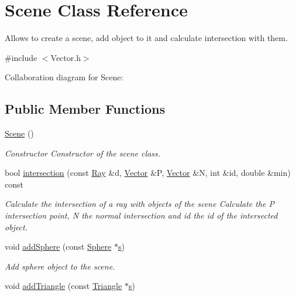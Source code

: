 \hypertarget{classScene}{}\section{Scene Class Reference}
\label{classScene}


Allows to create a scene, add object to it and calculate intersection with them.  




{\ttfamily \#include $<$Vector.\+h$>$}



Collaboration diagram for Scene\+:
\subsection*{Public Member Functions}
\begin{DoxyCompactItemize}
\item 
\mbox{\label{classScene_ad10176d75a9cc0da56626f682d083507}} 
\hyperlink{classScene_ad10176d75a9cc0da56626f682d083507}{Scene} ()
\begin{DoxyCompactList}\small\item\em Constructor Constructor of the scene class. \end{DoxyCompactList}\item 
bool \hyperlink{classScene_a2006d6fa80e8bf343da5a8ed3d1f5140}{intersection} (const \hyperlink{classRay}{Ray} \&d, \hyperlink{classVector}{Vector} \&P, \hyperlink{classVector}{Vector} \&N, int \&id, double \&min) const
\begin{DoxyCompactList}\small\item\em Calculate the intersection of a ray with objects of the scene Calculate the P intersection point, N the normal intersection and id the id of the intersected object. \end{DoxyCompactList}\item 
void \hyperlink{classScene_aa1cc40909ebbe9ed5933566d9a3663d2}{add\+Sphere} (const \hyperlink{classSphere}{Sphere} $\ast$\hyperlink{test_8cpp_aecc1396fc611f6e71d5d70228e7b089a}{s})
\begin{DoxyCompactList}\small\item\em Add sphere object to the scene. \end{DoxyCompactList}\item 
void \hyperlink{classScene_a2a8ed37427379fed62a9a71e7d266223}{add\+Triangle} (const \hyperlink{classTriangle}{Triangle} $\ast$\hyperlink{test_8cpp_aecc1396fc611f6e71d5d70228e7b089a}{s})

\end{DoxyCompactItemize}
